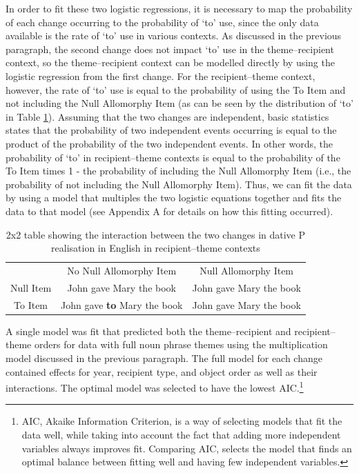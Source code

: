 	In order to fit these two logistic regressions, it is necessary to map the probability of each change occurring to the probability of `to' use, since the only data available is the rate of `to' use in various contexts. As discussed in the previous paragraph, the second change does not impact `to' use in the theme--recipient context, so the theme--recipient context can be modelled directly by using the logistic regression from the first change. For the recipient--theme context, however, the rate of `to' use is equal to the probability of using the To Item and not including the Null Allomorphy Item (as can be seen by the distribution of `to' in Table \ref{tab:2x2int}). Assuming that the two changes are independent, basic statistics states that the probability of two independent events occurring is equal to the product of the probability of the two independent events. In other words, the probability of `to' in recipient--theme contexts is equal to the probability of the To Item times 1 - the probability of including the Null Allomorphy Item (i.e., the probability of not including the Null Allomorphy Item). Thus, we can fit the data by using a model that multiples the two logistic equations together and fits the data to that model (see Appendix A for details on how this fitting occurred).

	\begin{table}[ht!]
		\begin{tabular}{ccc}
					& No Null Allomorphy Item & Null Allomorphy Item\\
			Null Item	& John gave Mary the book & John gave Mary the book\\
			To Item 	& John gave \textbf{to} Mary the book & John gave Mary the book\\
		\end{tabular}
		\caption{2x2 table showing the interaction between the two changes in dative P realisation in English in recipient--theme contexts}
		\label{tab:2x2int}
	\end{table}

	A single model was fit that predicted both the theme--recipient and recipient--theme orders for data with full noun phrase themes using the multiplication model discussed in the previous paragraph. The full model for each change contained effects for year, recipient type, and object order as well as their interactions. The optimal model was selected to have the lowest AIC.\footnote{AIC, Akaike Information Criterion, is a way of selecting models that fit the data well, while taking into account the fact that adding more independent variables always improves fit. Comparing AIC, selects the model that finds an optimal balance between fitting well and having few independent variables.} 
	
